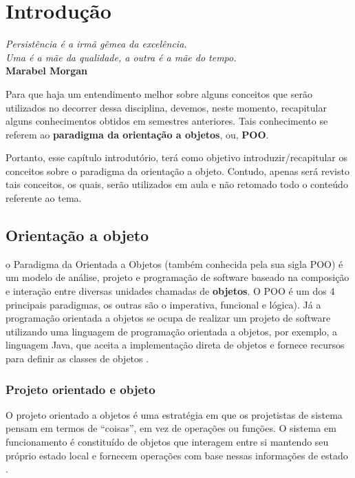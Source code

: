 \chapter{Introdução}\label{cap:cap1}

\begin{flushright}
  \textit{
    Persistência é a irmã gêmea da excelência. \\
    Uma é a mãe da qualidade, a outra é a mãe do tempo.
  } \\
  
  \textbf{Marabel Morgan}
\end{flushright}


Para que haja um entendimento melhor sobre alguns conceitos que serão utilizados no decorrer dessa disciplina, devemos, neste momento, recapitular alguns conhecimentos obtidos em semestres anteriores. Tais conhecimento se referem ao \textbf{paradigma da orientação a objetos}, ou, \textbf{POO}. 

Portanto, esse capítulo introdutório, terá como objetivo introduzir/recapitular os conceitos sobre o paradigma da orientação a objeto. Contudo, apenas será revisto tais conceitos, os quais, serão utilizados em aula e não retomado todo o conteúdo referente ao tema.

\section{Orientação a objeto}

o Paradigma da Orientada a Objetos (também conhecida pela sua sigla POO) é um 
modelo de análise, projeto e programação de software baseado na composição e 
interação entre diversas unidades chamadas de \textbf{objetos}. O POO é um dos 4 
principais paradigmas, os outras são o imperativa,  funcional e lógica). Já a programação orientada a objetos se ocupa de realizar um projeto de software utilizando uma linguagem de programação orientada a objetos, por exemplo, a linguagem Java, que aceita a implementação direta de objetos e fornece recursos para definir as classes de objetos \cite{sommerville2003engenharia}.

\subsection{Projeto orientado e objeto}

O projeto orientado a objetos é uma estratégia em que os projetistas de sistema pensam em termos de ``coisas'', em vez de operações ou funções. O sistema em funcionamento é constituído de objetos que interagem entre si mantendo seu próprio estado local e fornecem operações com base nessas informações de estado \cite{sommerville2003engenharia}.

